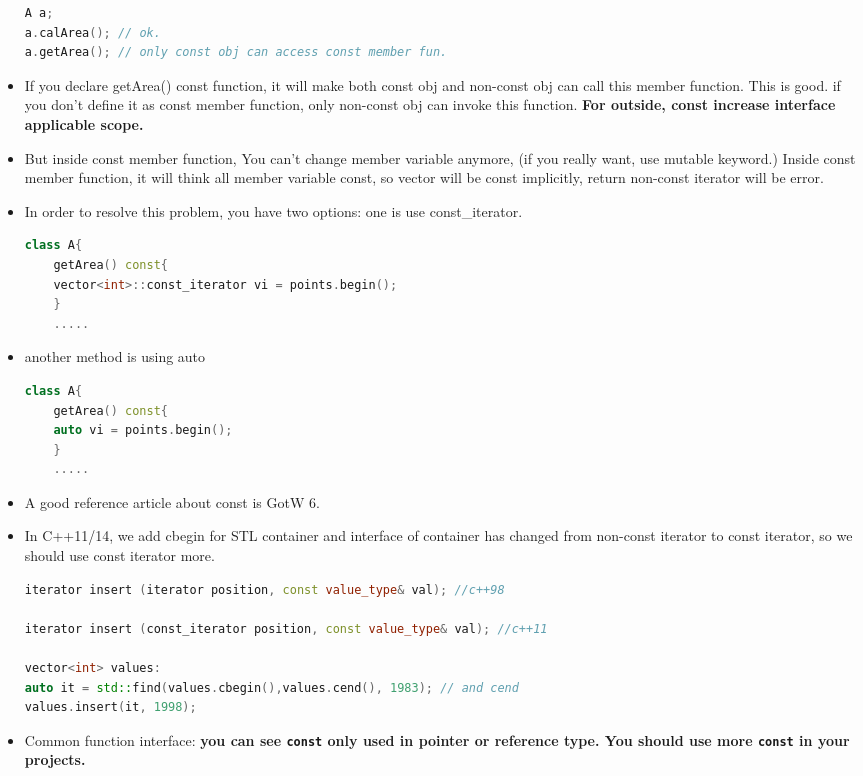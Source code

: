 \documentclass[a4paper,12pt,twoside]{book}
\begin{document}
\begin{itemize}
\begin{lstlisting}[frame=single, language=c++]
A a;
a.calArea(); // ok.
a.getArea(); // only const obj can access const member fun.
\end{lstlisting}


\item If you declare getArea() const function, it will make both const obj and non-const obj can call this member function. This is good. if you don't define it as const member function, only non-const obj can invoke this function. \textbf{For outside, const increase interface applicable scope.}

\item But inside const member function, You can't change member variable anymore, (if you really want, use mutable keyword.) Inside const member function, it will think all member variable const, so vector will be const implicitly, return non-const iterator will be error. 

\item In order to resolve this problem, you have two options: one is use const\_iterator. 
\begin{lstlisting}[frame=single, language=c++]
class A{
	getArea() const{
	vector<int>::const_iterator vi = points.begin();
	}
	.....
\end{lstlisting}

\item another method is using auto

\begin{lstlisting}[frame=single, language=c++]
class A{
	getArea() const{
	auto vi = points.begin();
	}
	.....
\end{lstlisting}
\item A good reference article about const is GotW 6. 

\item In C++11/14, we add cbegin for STL container and interface of container has changed from non-const iterator to const iterator, so we should use const iterator more. 
\begin{lstlisting}[frame=single, language=c++]
iterator insert (iterator position, const value_type& val); //c++98

iterator insert (const_iterator position, const value_type& val); //c++11

vector<int> values:
auto it = std::find(values.cbegin(),values.cend(), 1983); // and cend
values.insert(it, 1998);
\end{lstlisting}


\item Common function interface: \textbf{you can see \texttt{const} only used in pointer or reference type. You should use more \texttt{const} in your projects. }


\end{itemize}
\end{document}
